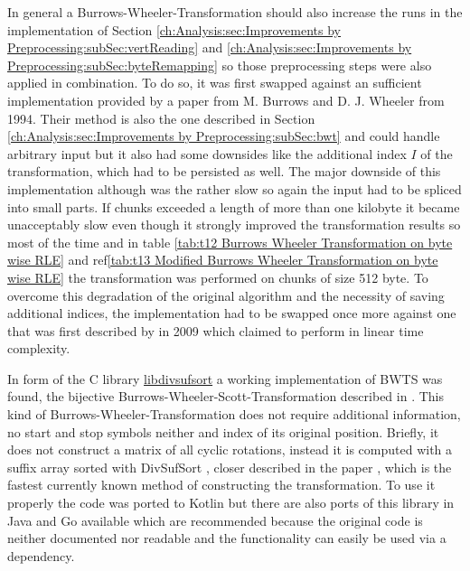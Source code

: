 \par{
In general a Burrows-Wheeler-Transformation should also increase the runs in the implementation of Section \ref{ch:Analysis:sec:Improvements by Preprocessing:subSec:vertReading} and \ref{ch:Analysis:sec:Improvements by Preprocessing:subSec:byteRemapping} so those preprocessing steps were also applied in combination. To do so, it was first swapped against an sufficient implementation provided by a paper from M. Burrows and D. J. Wheeler \cite{Burrows94} from 1994. Their method is also the one described in Section \ref{ch:Analysis:sec:Improvements by Preprocessing:subSec:bwt} and could handle arbitrary input but it also had some downsides like the additional index $I$ of the transformation, which had to be persisted as well. The major downside of this implementation although was the rather slow so again the input had to be spliced into small parts. If chunks exceeded a length of more than one kilobyte it became unacceptably slow even though it strongly improved the transformation results so most of the time and in table \ref{tab:t12 Burrows Wheeler Transformation on byte wise RLE} and ref\ref{tab:t13 Modified Burrows Wheeler Transformation on byte wise RLE} the transformation was performed on chunks of size 512 byte. To overcome this degradation of the original algorithm and the necessity of saving  additional indices, the implementation had to be swapped once more against one that was first described by \cite{Burrows-linear-time} in 2009 which claimed to perform in linear time complexity.
}
\par{
In form of the C library \href{https://code.google.com/archive/p/libdivsufsort}{libdivsufsort} a working implementation of BWTS was found, the bijective Burrows-Wheeler-Scott-Transformation described in \cite{DBLP:journals/corr/abs-1201-3077}. This kind of Burrows-Wheeler-Transformation does not require additional information, no start and stop symbols neither and index of its original position. Briefly, it does not construct a matrix of all cyclic rotations, instead it is computed with a suffix array sorted with DivSufSort \cite{LibDivSufSort}, closer described in the paper \cite{DBLP:journals/corr/abs-1710-01896}, which is the fastest currently known method of constructing the transformation. To use it properly the code was ported to Kotlin but there are also ports of this library in Java and Go available which are recommended because the original code is neither documented nor readable and the functionality can easily be used via a dependency.
}
